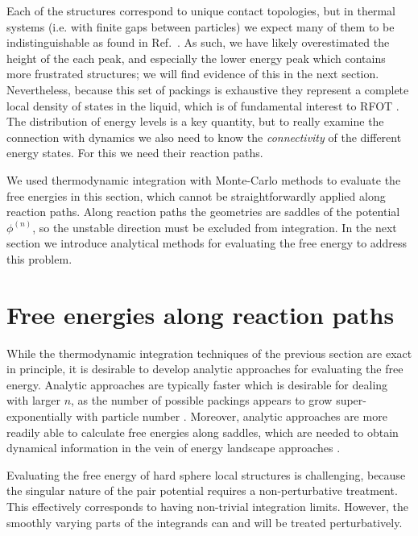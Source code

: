 \documentclass[11pt,twoside]{report}
\begin{document}
Each of the structures correspond to unique contact topologies, but in thermal systems (i.e. with finite gaps between particles) we expect many of them to be indistinguishable as found in Ref.\ \cite{TrombachPRE2018}.
As such, we have likely overestimated the height of the each peak, and especially the lower energy peak which contains more frustrated structures; we will find evidence of this in the next section.
Nevertheless, because this set of packings is exhaustive they represent a complete local density of states in the liquid, which is of fundamental interest to RFOT \cite{LubchenkoARPC2007}.
The distribution of energy levels is a key quantity, but to really examine the connection with dynamics we also need to know the \emph{connectivity} of the different energy states.
For this we need their reaction paths.

We used thermodynamic integration with Monte-Carlo methods to evaluate the free energies in this section, which cannot be straightforwardly applied along reaction paths.
Along reaction paths the geometries are saddles of the potential $\phi^{(n)}$, so the unstable direction must be excluded from integration.
In the next section we introduce analytical methods for evaluating the free energy to address this problem.


\section{Free energies along reaction paths}
\label{sec:reaction-paths}

While the thermodynamic integration techniques of the previous section are exact in principle, it is desirable to develop analytic approaches for evaluating the free energy.
Analytic approaches are typically faster which is desirable for dealing with larger $n$, as the number of possible packings appears to grow super-exponentially with particle number \cite{Holmes-CerfonSR2016}.
Moreover, analytic approaches are more readily able to calculate free energies along saddles, which are needed to obtain dynamical information in the vein of energy landscape approaches \cite{Wales2004}.

Evaluating the free energy of hard sphere local structures is challenging, because the singular nature of the pair potential requires a non-perturbative treatment.
This effectively corresponds to having non-trivial integration limits.
However, the smoothly varying parts of the integrands can and will be treated perturbatively.
\end{document}
